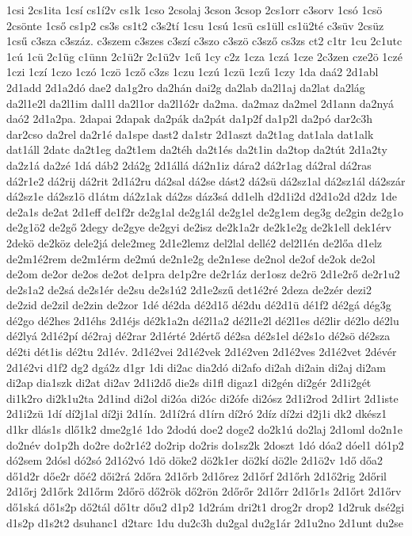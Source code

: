 {1csi
2cs1ita
1csí
cs1í2v
cs1k
1cso
2csolaj
3cson
3csop
2cs1orr
c3sorv
1csó
1csö
2csönte
1cső
cs1p2
cs3s
cs1t2
c3s2tí
1csu
1csú
1csü
cs1üll
cs1ü2té
c3süv
2csüz
1csű
c3sza
c3száz.
c3szem
c3szes
c3szí
c3szo
c3szö
c3sző
cs3zs
ct2
c1tr
1cu
2c1utc
1cú
1cü
2c1üg
c1ünn
2c1ü2r
2c1ü2v
1cű
1cy
c2z
1cza
1czá
1cze
2c3zen
cze2ö
1czé
1czi
1czí
1czo
1czó
1czö
1cző
c3zs
1czu
1czú
1czü
1czű
1czy
1da
daá2
2d1abl
2d1add
2d1a2dó
dae2
da1g2ro
da2hán
dai2g
da2lab
da2l1aj
da2lat
da2lág
da2l1e2l
da2l1im
dal1l
da2l1or
da2l1ó2r
da2ma.
da2maz
da2mel
2d1ann
da2nyá
daó2
2d1a2pa.
2dapai
2dapak
da2pák
da2pát
da1p2f
da1p2l
da2pó
dar2c3h
dar2cso
da2rel
da2r1é
da1spe
dast2
da1str
2d1aszt
da2t1ag
dat1ala
dat1alk
dat1áll
2datc
da2t1eg
da2t1em
da2téh
da2t1és
da2t1in
da2top
da2tút
2d1a2ty
da2z1á
da2zé
1dá
dáb2
2dá2g
2d1állá
dá2n1iz
dára2
dá2r1ag
dá2ral
dá2ras
dá2r1e2
dá2rij
dá2rit
2d1á2ru
dá2sal
dá2se
dást2
dá2sü
dá2sz1al
dá2sz1ál
dá2szár
dá2sz1e
dá2sz1ö
d1átm
dá2z1ak
dá2zs
dáz3sá
dd1elh
d2d1i2d
d2d1o2d
d2dz
1de
de2a1s
de2at
2d1eff
de1f2r
de2g1al
de2g1ál
de2g1el
de2g1em
deg3g
de2gin
de2g1o
de2g1ö2
de2gő
2degy
de2gye
de2gyi
de2isz
de2k1a2r
de2k1e2g
de2k1ell
dek1érv
2dekö
de2köz
dele2já
dele2meg
2d1e2lemz
del2lal
dellé2
del2l1én
de2lőa
d1elz
de2m1é2rem
de2m1érm
de2mú
de2n1e2g
de2n1ese
de2nol
de2of
de2ok
de2ol
de2om
de2or
de2os
de2ot
de1pra
de1p2re
de2r1áz
der1osz
de2rö
2d1e2rő
de2r1u2
de2s1a2
de2sá
de2s1ér
de2su
de2s1ú2
2d1e2szű
det1é2ré
2deza
de2zér
dezi2
de2zid
de2zil
de2zin
de2zor
1dé
dé2da
dé2d1ő
dé2du
dé2d1ü
dé1f2
dé2gá
dég3g
dé2go
dé2hes
2d1éhs
2d1éjs
dé2k1a2n
dé2l1a2
dé2l1e2l
dé2l1es
dé2lir
dé2lo
dé2lu
dé2lyá
2d1é2pí
dé2raj
dé2rar
2d1érté
2dértő
dé2sa
dé2s1el
dé2s1o
dé2sö
dé2sza
dé2ti
dét1is
dé2tu
2d1év.
2d1é2vei
2d1é2vek
2d1é2ven
2d1é2ves
2d1é2vet
2dévér
2d1é2vi
d1f2
dg2
dgá2z
d1gr
1di
di2ac
dia2dó
di2afo
di2ah
di2ain
di2aj
di2am
di2ap
dia1szk
di2at
di2av
2d1i2dő
die2s
di1fl
digaz1
di2gén
di2gér
2d1i2gét
di1k2ro
di2k1u2ta
2d1ind
di2ol
di2óa
di2óc
di2ófe
di2ósz
2d1i2rod
2d1irt
2d1iste
2d1i2zü
1dí
dí2j1al
dí2ji
2d1ín.
2d1í2rá
d1írn
dí2ró
2díz
dí2zi
d2j1i
dk2
dkész1
d1kr
dlás1s
dlő1k2
dme2g1é
1do
2dodú
doe2
doge2
do2k1ú
do2laj
2d1oml
do2n1e
do2név
do1p2h
do2re
do2r1é2
do2rip
do2ris
do1sz2k
2doszt
1dó
dóa2
dóel1
dó1p2
dó2sem
2dósl
dó2só
2d1ó2vó
1dö
döke2
dö2k1er
dö2kí
dö2le
2d1ö2v
1dő
dőa2
dő1d2r
dőe2r
dőé2
dői2rá
2dőra
2d1őrb
2d1őrez
2d1őrf
2d1őrh
2d1ő2rig
2dőril
2d1őrj
2d1őrk
2d1őrm
2dőrö
dő2rök
dő2rön
2dőrőr
2d1őrr
2d1őr1s
2d1őrt
2d1őrv
dő1ská
dő1s2p
dő2tál
dő1tr
dőu2
d1p2
1d2rám
dri2t1
drog2r
drop2
1d2ruk
dsé2gi
d1s2p
d1s2t2
dsuhanc1
d2tarc
1du
du2c3h
du2gal
du2g1ár
2d1u2no
2d1unt
du2se
}
